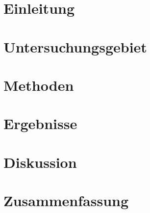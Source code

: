 \lstlistoflistings


\newpage %


\section{Einleitung}


\clearpage

\section{Untersuchungsgebiet}


\clearpage

\section{Methoden}


\clearpage

\section{Ergebnisse}


\clearpage

\section{Diskussion}


\clearpage

\section{Zusammenfassung}


\clearpage




 

